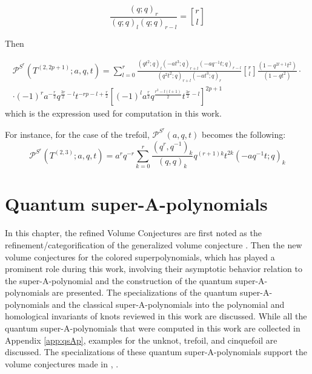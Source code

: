 \documentclass[a4paper,titlepage,twoside]{book}
\begin{document}
\[
\frac{ (q;q)_r }{ (q;q)_l (q;q)_{r-l } } = { r \brack l } 
\]

Then

\begin{equation}
\begin{gathered}
\mathcal{P}^{ S^r}(T^{(2,2p+1) }; a,q,t )= \sum_{l=0}^r \frac{ (qt^2 ; q)_l (-at^3; q)_{r+l} ( -aq^{-1} t; q)_{r-l } }{ (q^2 t^2 ; q)_{r+l } (-at^3 ; q)_r } { r \brack l } \frac{ ( 1-q^{2l + 1 } t^2 ) }{ ( 1- qt^2 ) } \cdot \\
\cdot (-1)^r a^{-\frac{r}{2} } q^{ \frac{3r}{2} -l } t^{-rp  - l + \frac{r}{2} } \left[ (-1)^l a^{\frac{r}{2} } q^{  \frac{ r^2 - l (l+1 ) }{2} } t^{ \frac{3r}{2} - l } \right]^{2p+1} 
\end{gathered} \label{Eq:coloredsuperpolytorusknotrefinedCS}
\end{equation}
which is the expression used for computation in this work.  

For instance, for the case of the trefoil, $\mathcal{P}^{S^r}{(a,q,t)}$ becomes the following:
\begin{equation}
\mathcal{P}^{S^r}{(T^{(2,3)}; a,q,t)} = a^r q^{-r} \sum_{k=0}^r \frac{ ( q^r, q^{-1} )_k }{ (q,q)_k } q^{(r+1)k } t^{2k} ( -aq^{-1} t; q )_k  \label{Eq:coloredsuperpolytrefoilrefinedCS}
\end{equation}





\chapter{Quantum super-A-polynomials} \label{chap:quantumsuperApolynomials}

In this chapter, the refined Volume Conjectures \cite{FujiGukovSulkowski2012} are first noted as the refinement/categorification of the generalized volume conjecture \cite{Gukov2005}.  Then the new volume conjectures \cite{bib:FGS2012} for the colored superpolynomials, which has played a prominent role during this work, involving their asymptotic behavior relation to the super-A-polynomial and the construction of the quantum super-A-polynomials are presented.  The specializations of the quantum super-A-polynomials and the classical super-A-polynomials into the polynomial and homological invariants of knots reviewed in this work are discussed.  While all the quantum super-A-polynomials that were computed in this work are collected in Appendix \ref{app:qsAp}, examples for the unknot, trefoil, and cinquefoil are discussed.  The specializations of these quantum super-A-polynomials support the volume conjectures made in \cite{bib:FGS2012}, \cite{FujiSulkowski2013}.
\end{document}
